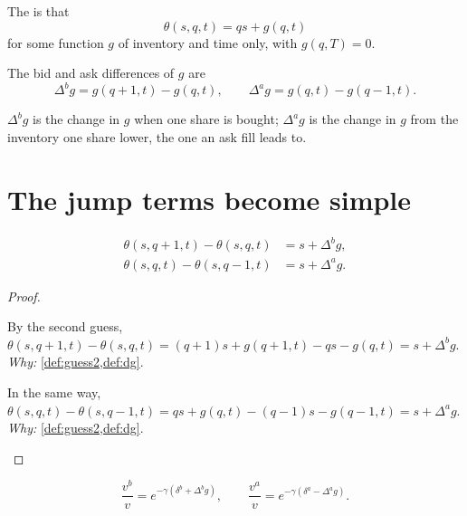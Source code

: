 \begin{definition}
\label{def:guess2}
The  is that
\[
  \theta(s,q,t)=qs+g(q,t)
\]
for some function $g$ of inventory and time only, with $g(q,T)=0$.
\end{definition}

\begin{definition}[Differences of $g$]
\label{def:dg}
The bid and ask differences of $g$ are
\[
  \Delta^bg=g(q+1,t)-g(q,t),\qquad \Delta^ag=g(q,t)-g(q-1,t).
\]
\end{definition}

$\Delta^bg$ is the change in $g$ when one share is bought; $\Delta^ag$ is the change in $g$ from the inventory one share lower, the one an ask fill leads to.

\section{The jump terms become simple}

\begin{result}
\label{res:dtheta}
\[
  \begin{aligned}
    \theta(s,q+1,t)-\theta(s,q,t)&=s+\Delta^bg,\\
    \theta(s,q,t)-\theta(s,q-1,t)&=s+\Delta^ag.
  \end{aligned}
\]
\end{result}

\begin{proof}
\begin{steps}
  \item By the second guess, $\theta(s,q+1,t)-\theta(s,q,t)=(q+1)s+g(q+1,t)-qs-g(q,t)=s+\Delta^bg$.
  \\ \emph{Why:} \cref{def:guess2,def:dg}.
  \item In the same way, $\theta(s,q,t)-\theta(s,q-1,t)=qs+g(q,t)-(q-1)s-g(q-1,t)=s+\Delta^ag$.
  \\ \emph{Why:} \cref{def:guess2,def:dg}.
\end{steps}
\end{proof}

\begin{result}
\label{res:ratios}
\[
  \frac{v^b}{v}=e^{-\gamma(\delta^b+\Delta^bg)},\qquad
  \frac{v^a}{v}=e^{-\gamma(\delta^a-\Delta^ag)}.
\]
\end{result}


